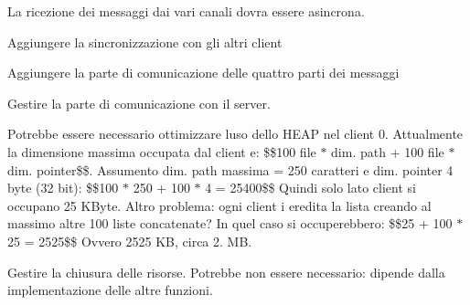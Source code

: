 
\begin{DoxyRefList}
\item[\label{todo__todo000007}%
\Hypertarget{todo__todo000007}%
Globale \hyperlink{client_8h_a0ddf1224851353fc92bfbff6f499fa97}{main} (int argc, char $\ast$argv\mbox{[}\mbox{]})]La ricezione dei messaggi dai vari canali dovra\textquotesingle{} essere asincrona.  
\item[\label{todo__todo000005}%
\Hypertarget{todo__todo000005}%
Globale \hyperlink{client_8h_a54b47b58f228d7bc9827d2919687e25a}{operazioni\+\_\+figlio} (char $\ast$file\+Path)]Aggiungere la sincronizzazione con gli altri client

Aggiungere la parte di comunicazione delle quattro parti dei messaggi 
\item[\label{todo__todo000002}%
\Hypertarget{todo__todo000002}%
Globale \hyperlink{client_8h_a48d605ff689f470746c858648f0a98c2}{S\+I\+G\+I\+N\+T\+Signal\+Handler} (int sig)]Gestire la parte di comunicazione con il server.

Potrebbe essere necessario ottimizzare l\textquotesingle{}uso dello H\+E\+AP nel client 0. Attualmente la dimensione massima occupata dal client e\textquotesingle{}\+: \$\$100 file $\ast$ dim. path + 100 file $\ast$ dim. pointer\$\$. Assumento dim. path massima = 250 caratteri e dim. pointer 4 byte (32 bit)\+: \$\$100 $\ast$ 250 + 100 $\ast$ 4 = 25400\$\$ Quindi solo lato client si occupano 25 K\+Byte. Altro problema\+: ogni client i eredita la lista creando al massimo altre 100 liste concatenate? In quel caso si occuperebbero\+: \$\$25 + 100 $\ast$ 25 = 2525\$\$ Ovvero 2525 KB, circa 2. MB. 
\item[\label{todo__todo000004}%
\Hypertarget{todo__todo000004}%
Globale \hyperlink{client_8h_a50b22adcb76198fcd9402a97ff4711bf}{S\+I\+G\+U\+S\+R1\+Signal\+Handler} (int sig)]Gestire la chiusura delle risorse. Potrebbe non essere necessario\+: dipende dalla implementazione delle altre funzioni.
\end{DoxyRefList}